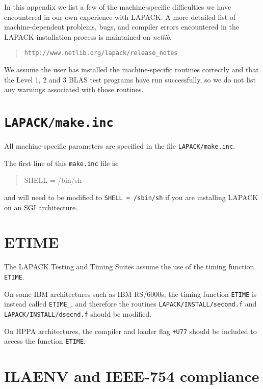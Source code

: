\dent
In this appendix we list a few of the machine-specific difficulties we
have
encountered in our own experience with LAPACK.  A more detailed list
of machine-dependent problems, bugs, and compiler errors encountered
in the LAPACK installation process is maintained
on {\em netlib}.
\begin{quote}
{\tt http://www.netlib.org/lapack/release\_notes}
\end{quote}

We assume the user has installed the machine-specific routines
correctly and that the Level 1, 2 and 3 BLAS test programs have run
successfully, so we do not list any warnings associated with those
routines.

\section{{\tt LAPACK/make.inc}}

All machine-specific
parameters are specified in the file {\tt LAPACK/make.inc}.

The first line of this {\tt make.inc} file is:
\begin{quote}
SHELL = /bin/sh
\end{quote}
and will need to be modified to {\tt SHELL = /sbin/sh} if you are
installing LAPACK on an SGI architecture.

\section{ETIME}

The LAPACK Testing
and Timing Suites assume the use of the timing function {\tt ETIME}.

On some IBM architectures such as IBM RS/6000s, the timing function
{\tt ETIME} is instead called {\tt ETIME\_}, and therefore the routines
{\tt LAPACK/INSTALL/second.f} and {\tt LAPACK/INSTALL/dsecnd.f} should
be modified.

On HPPA architectures,
the compiler and loader flag {\tt +U77} should be included to access
the function {\tt ETIME}.

\section{ILAENV and IEEE-754 compliance}

%

